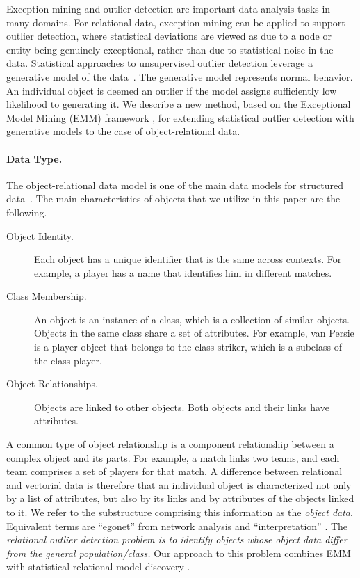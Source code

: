 {Exception mining and outlier detection are important data analysis tasks in many domains. For relational data, exception mining can be applied to support outlier detection, where statistical deviations are viewed as due to a node or entity being genuinely exceptional, rather than due to statistical noise in the data. Statistical approaches to unsupervised outlier detection leverage a generative model of the data~\citep{aggarwal2013}. The generative model represents normal behavior. An individual object is deemed an outlier if  the model assigns sufficiently low likelihood to generating it. 
We describe a new method, based on the Exceptional Model Mining (EMM) framework \citep{Duivesteijn2016}, for extending statistical  outlier detection with generative models to the case of object-relational data. 



\paragraph{Data Type.} The object-relational data model is one of the main data models for structured data~\citep{Koller1997}. The main 
characteristics of objects that we utilize in this paper are the following. 

\begin{description}
\item[Object Identity.] Each object has a unique identifier that is the same across contexts. For example, a player has a name that identifies him in different matches. 
\item[Class Membership.] An object is an instance of a class, which is a collection of similar objects. Objects in the same class share a set of attributes. For example, van Persie is a player object that belongs to the class striker, which is a subclass of the  class player.
\item[Object Relationships.] Objects are linked  to other objects. Both objects and their links have attributes. 
\end{description}


A common type of object relationship is a component relationship between a complex object and its parts.
For example, a match links two teams, and each team comprises a set of players for that match. A difference between relational and vectorial data is therefore that an individual object is characterized not only by a list of attributes, but also by its links and by attributes of the objects linked to it. We refer to the substructure comprising this information as the {\em object data}. Equivalent terms are ``egonet'' from network analysis \citep{Akoglu2015} and ``interpretation'' \citep{Maervoet2012}. The {\em relational outlier detection problem is to identify objects whose object data differ from the general population/class.} Our approach to this problem combines EMM with statistical-relational model discovery \citep{SRL2007}.

}

